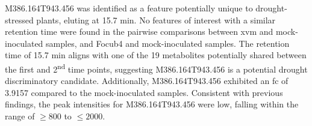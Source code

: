M386.164T943.456 was identified as a feature potentially unique to drought-stressed plants, eluting at 15.7 min. No features of interest with a similar retention time were found in the pairwise comparisons between \ac{xvm} and mock-inoculated samples, and \ac{Focub4} and mock-inoculated samples. The retention time of 15.7 min aligns with one of the 19 metabolites potentially shared between the first and 2\textsuperscript{nd} time points, suggesting M386.164T943.456 is a potential drought discriminatory candidate. Additionally, M386.164T943.456 exhibited an \ac{fc} of 3.9157 compared to the mock-inoculated samples. Consistent with previous findings, the peak intensities for M386.164T943.456 were low, falling within the range of $\geq800$ to $\leq2000$. 





